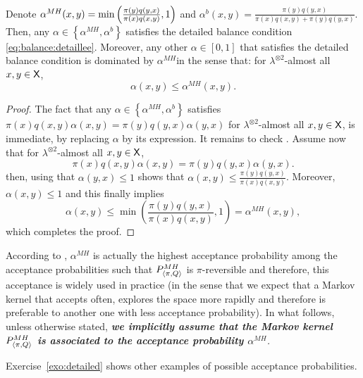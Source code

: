\documentclass[english,graybox,envcountchap,envcountsame,sectrefs,shortlabels]{svmono}
\theoremstyle{style}
\newenvironment{svmultproof}{\small \begin{proof}}{\end{proof}}
\newcommand{\bfr}{\begin{framed}}
\newcommand{\efr}{\end{framed}}
\begin{document}
\bfr
\begin{lemma}
\label{lem:acceptance} Denote $\alpha^{MH}(x,y)=\min\left(\frac{\pi(y)q(y,x)}{\pi(x)q(x,y)},1\right)$
and $\alpha^{b}(x,y)=\frac{\pi(y)q(y,x)}{\pi(x)q(x,y)+\pi(y)q(y,x)}$.
Then, any $\alpha\in\left\{ \alpha^{MH},\alpha^{b}\right\} $ satisfies
the detailed balance condition \eqref{eq:balance:detaillee}. Moreover, any other $\alpha\in[0,1]$
that satisfies the detailed balance condition is dominated by $\alpha^{MH}$in
the sense that: for $\lambda^{\otimes2}$-almost all $x,y\in\mathsf{X}$,
\begin{equation}
\alpha(x,y)\leq\alpha^{MH}(x,y).\label{eq:accept:max}
\end{equation}

\end{lemma}
\efr
\begin{svmultproof}
The fact that any $\alpha\in\left\{ \alpha^{MH},\alpha^{b}\right\} $
satisfies $\pi(x)q(x,y)\alpha(x,y)=\pi(y)q(y,x)\alpha(y,x)$ for $\lambda^{\otimes2}$-almost
all $x,y\in\mathsf{X}$, is immediate, by replacing $\alpha$ by its expression.
It remains to check  . Assume now that for $\lambda^{\otimes2}$-almost
all $x,y\in\mathsf{X}$,
\[
\pi(x)q(x,y)\alpha(x,y)=\pi(y)q(y,x)\alpha(y,x).
\]
then, using that $\alpha(y,x)\leq1$ shows that $\alpha(x,y)\leq\frac{\pi(y)q(y,x)}{\pi(x)q(x,y)}$.
Moreover, $\alpha(x,y)\leq1$ and this finally implies
\[
\alpha(x,y)\leq\min\left(\frac{\pi(y)q(y,x)}{\pi(x)q(x,y)},1\right)=\alpha^{MH}(x,y),
\]
which completes the proof.
\end{svmultproof}

According to , $\alpha^{MH}$ is actually the highest
acceptance probability among the acceptance probabilities such that
$P_{\langle\pi,Q\rangle}^{MH}$ is $\pi$-reversible and therefore, this acceptance
is widely used in practice (in the sense that we expect that a Markov
kernel that accepts often, explores the space more rapidly and therefore
is preferable to another one with less acceptance probability). In
what follows, unless otherwise stated, \textbf{\emph{we implicitly
assume that the Markov kernel $P_{\langle\pi,Q\rangle}^{MH}$ is associated to the acceptance
probability $\alpha^{MH}$}}\emph{.}

Exercise~\ref{exo:detailed} shows other examples of possible acceptance probabilities.
\end{document}
